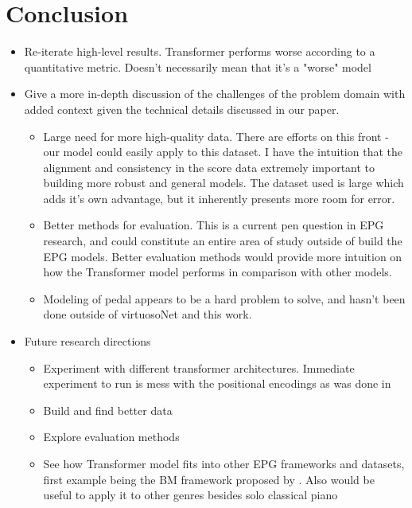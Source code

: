 \chapter{Conclusion} \label{ch:ch5}

\begin{itemize}
    \item Re-iterate high-level results. Transformer performs worse according to a quantitative metric. Doesn't necessarily mean that it's a "worse" model 
    \item Give a more in-depth discussion of the challenges of the problem domain with added context given the technical details discussed in our paper.
    \begin{itemize}
        \item Large need for more high-quality data. There are efforts on this front \cite{foscarin2020asap} - our model could easily apply to this dataset. I have the intuition that the alignment and consistency in the score data extremely important to building more robust and general models. The dataset used is large which adds it's own advantage, but it inherently presents more room for error. 
        \item Better methods for evaluation. This is a current pen question in EPG research, and could constitute an entire area of study outside of build the EPG models. Better evaluation methods would provide more intuition on how the Transformer model performs in comparison with other models. 
        \item Modeling of pedal appears to be a hard problem to solve, and hasn't been done outside of virtuosoNet and this work.
    \end{itemize}
    \item Future research directions
    \begin{itemize}
        \item Experiment with different transformer architectures. Immediate experiment to run is mess with the positional encodings as was done in \cite{huang2018music}
        \item Build and find better data 
        \item Explore evaluation methods
        \item See how Transformer model fits into other EPG frameworks and datasets, first example being the BM framework proposed by \cite{eduardo2018computational}. Also would be useful to apply it to other genres besides solo classical piano
    \end{itemize}

\end{itemize}
